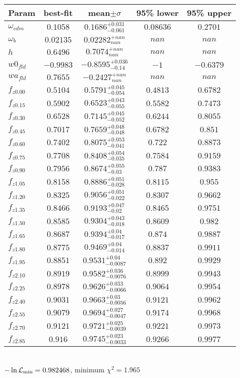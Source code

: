 \begin{tabular}{|l|c|c|c|c|} 
 \hline 
Param & best-fit & mean$\pm\sigma$ & 95\% lower & 95\% upper \\ \hline 
$\omega_{cdm }$ &$0.1058$ & $0.1686_{-0.061}^{+0.031}$ & $0.08636$ & $0.2701$ \\ 
$\omega_{b }$ &$0.02135$ & $0.02282_{nan}^{+nan}$ & $nan$ & $nan$ \\ 
$h$ &$0.6496$ & $0.7074_{nan}^{+nan}$ & $nan$ & $nan$ \\ 
$w0_{fld }$ &$-0.9983$ & $-0.8595_{-0.14}^{+0.036}$ & $-1$ & $-0.6379$ \\ 
$wa_{fld }$ &$0.7655$ & $-0.2427_{nan}^{+nan}$ & $nan$ & $nan$ \\ 
$f_{z0.00 }$ &$0.5104$ & $0.5791_{-0.054}^{+0.045}$ & $0.4813$ & $0.6782$ \\ 
$f_{z0.15 }$ &$0.5902$ & $0.6523_{-0.055}^{+0.043}$ & $0.5582$ & $0.7473$ \\ 
$f_{z0.30 }$ &$0.6528$ & $0.7145_{-0.052}^{+0.045}$ & $0.6244$ & $0.8055$ \\ 
$f_{z0.45 }$ &$0.7017$ & $0.7659_{-0.048}^{+0.048}$ & $0.6782$ & $0.851$ \\ 
$f_{z0.60 }$ &$0.7402$ & $0.8075_{-0.041}^{+0.053}$ & $0.722$ & $0.8873$ \\ 
$f_{z0.75 }$ &$0.7708$ & $0.8408_{-0.035}^{+0.054}$ & $0.7584$ & $0.9159$ \\ 
$f_{z0.90 }$ &$0.7956$ & $0.8674_{-0.03}^{+0.055}$ & $0.787$ & $0.9383$ \\ 
$f_{z1.05 }$ &$0.8158$ & $0.8886_{-0.028}^{+0.051}$ & $0.8115$ & $0.955$ \\ 
$f_{z1.20 }$ &$0.8325$ & $0.9056_{-0.022}^{+0.051}$ & $0.8307$ & $0.9662$ \\ 
$f_{z1.35 }$ &$0.8466$ & $0.9193_{-0.02}^{+0.047}$ & $0.8465$ & $0.9751$ \\ 
$f_{z1.50 }$ &$0.8585$ & $0.9304_{-0.018}^{+0.043}$ & $0.8609$ & $0.982$ \\ 
$f_{z1.65 }$ &$0.8687$ & $0.9394_{-0.017}^{+0.04}$ & $0.874$ & $0.9887$ \\ 
$f_{z1.80 }$ &$0.8775$ & $0.9469_{-0.014}^{+0.04}$ & $0.8837$ & $0.9911$ \\ 
$f_{z1.95 }$ &$0.8851$ & $0.9531_{-0.0087}^{+0.04}$ & $0.892$ & $0.9929$ \\ 
$f_{z2.10 }$ &$0.8919$ & $0.9582_{-0.0076}^{+0.036}$ & $0.8999$ & $0.9943$ \\ 
$f_{z2.25 }$ &$0.8978$ & $0.9626_{-0.0066}^{+0.033}$ & $0.9064$ & $0.9954$ \\ 
$f_{z2.40 }$ &$0.9031$ & $0.9663_{-0.0056}^{+0.03}$ & $0.9121$ & $0.9962$ \\ 
$f_{z2.55 }$ &$0.9079$ & $0.9694_{-0.0047}^{+0.027}$ & $0.9174$ & $0.9968$ \\ 
$f_{z2.70 }$ &$0.9121$ & $0.9721_{-0.0039}^{+0.025}$ & $0.9221$ & $0.9973$ \\ 
$f_{z2.85 }$ &$0.916$ & $0.9745_{-0.0033}^{+0.023}$ & $0.9266$ & $0.9977$ \\ 
\hline 
 \end{tabular} \\ 
$-\ln{\cal L}_\mathrm{min} =0.982468$, minimum $\chi^2=1.965$ \\ 
